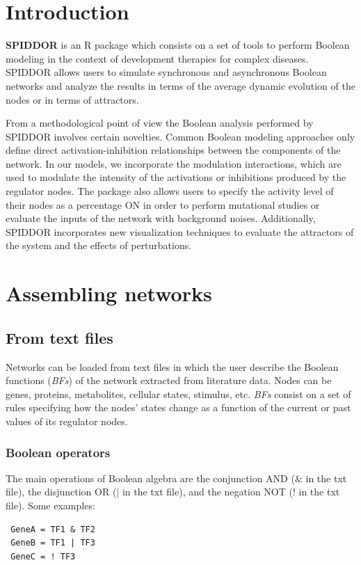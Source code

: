 \documentclass[a4paper]{article}
\begin{document}
\section{Introduction}
\textbf{SPIDDOR }is an R package which consists on a set of tools to perform Boolean modeling in the context of development therapies for complex diseases. SPIDDOR allows users to simulate synchronous and asynchronous Boolean networks and analyze the results in terms of the average dynamic evolution of the nodes or in terms of attractors.

From a methodological point of view the Boolean analysis performed by SPIDDOR involves certain novelties. Common Boolean modeling approaches only define direct activation-inhibition relationships between the components of the network. In our models, we incorporate the modulation interactions, which are used to modulate the intensity of the activations or inhibitions produced by the regulator nodes. The package also allows users to specify the activity level of their nodes as a percentage ON in order to perform mutational studies or evaluate the inputs of the network with background noises. Additionally, SPIDDOR incorporates new visualization techniques to evaluate the attractors of the system and the effects of perturbations.

\section{Assembling networks}

\subsection{From text files}
Networks can be loaded from text files in which the user describe the Boolean functions (\emph{BFs}) of the network extracted from literature data. Nodes can be genes, proteins, metabolites, cellular states, stimulus, etc. \emph{BFs} consist on a set of rules specifying how the nodes' states change as a function of the current or past values of its regulator nodes. 

\subsubsection{Boolean operators}
The main operations of Boolean algebra are the conjunction AND ($\&$ in the txt file), the disjunction OR ($|$ in the txt file), and the negation NOT ($!$ in the txt file). Some examples:
 \begin{verbatim}
 GeneA = TF1 & TF2
 GeneB = TF1 | TF3
 GeneC = ! TF3
 \end{verbatim}
\end{document}
